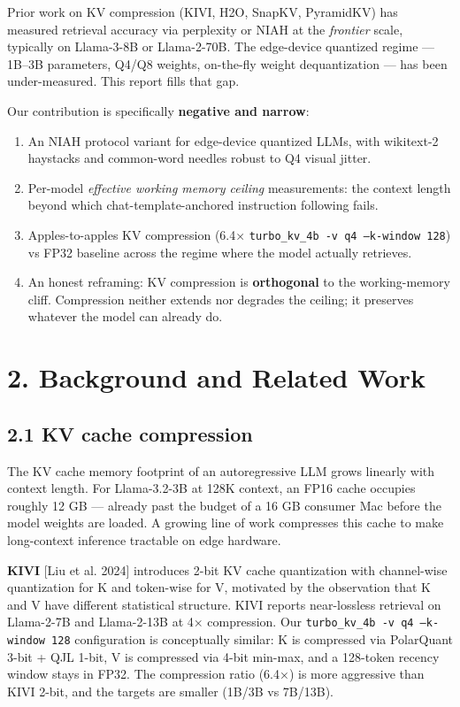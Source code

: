 \documentclass[11pt]{article}
\begin{document}
Prior work on KV compression (KIVI, H2O, SnapKV, PyramidKV) has measured retrieval accuracy via perplexity or NIAH at the \textit{frontier} scale, typically on Llama-3-8B or Llama-2-70B. The edge-device quantized regime — 1B–3B parameters, Q4/Q8 weights, on-the-fly weight dequantization — has been under-measured. This report fills that gap.


Our contribution is specifically \textbf{negative and narrow}:


\begin{enumerate}
\item An NIAH protocol variant for edge-device quantized LLMs, with wikitext-2 haystacks and common-word needles robust to Q4 visual jitter.
\item Per-model \textit{effective working memory ceiling} measurements: the context length beyond which chat-template-anchored instruction following fails.
\item Apples-to-apples KV compression (6.4× \texttt{turbo\_kv\_4b -v q4 --k-window 128}) vs FP32 baseline across the regime where the model actually retrieves.
\item An honest reframing: KV compression is \textbf{orthogonal} to the working-memory cliff. Compression neither extends nor degrades the ceiling; it preserves whatever the model can already do.
\end{enumerate}


\section*{2. Background and Related Work}


\subsection*{2.1 KV cache compression}


The KV cache memory footprint of an autoregressive LLM grows linearly with context length. For Llama-3.2-3B at 128K context, an FP16 cache occupies roughly 12 GB — already past the budget of a 16 GB consumer Mac before the model weights are loaded. A growing line of work compresses this cache to make long-context inference tractable on edge hardware.


\textbf{KIVI} [Liu et al. 2024] introduces 2-bit KV cache quantization with channel-wise quantization for K and token-wise for V, motivated by the observation that K and V have different statistical structure. KIVI reports near-lossless retrieval on Llama-2-7B and Llama-2-13B at 4× compression. Our \texttt{turbo\_kv\_4b -v q4 --k-window 128} configuration is conceptually similar: K is compressed via PolarQuant 3-bit + QJL 1-bit, V is compressed via 4-bit min-max, and a 128-token recency window stays in FP32. The compression ratio (6.4×) is more aggressive than KIVI 2-bit, and the targets are smaller (1B/3B vs 7B/13B).
\end{document}
